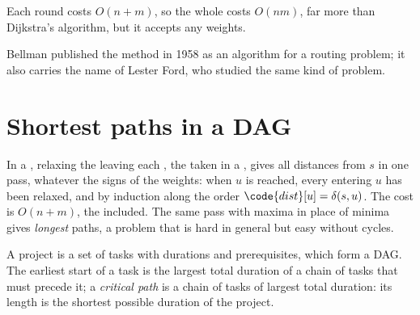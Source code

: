 Each round costs $O(n + m)$, so the whole costs $O(nm)$, far more than Dijkstra's algorithm, but it accepts any weights.

\label{out:b1:shortest-paths:bellman-ford}

Bellman published the method in 1958 as an algorithm for a routing problem; it also carries the name of Lester Ford,
who studied the same kind of problem.

\section{Shortest paths in a DAG}\label{sec:b1:shortest-paths:dag}

In a , relaxing the  leaving each , the  taken in a , gives
all distances from $s$ in one pass, whatever the signs of the weights: when $u$ is reached, every  entering $u$ has
been relaxed, and by induction along the order $\code{dist}[u] = \delta(s, u)$. The cost is $O(n + m)$, the
 included. The same pass with maxima in place of minima gives \emph{longest} paths, a problem that is
hard in general  but easy without cycles.

\begin{definition}\label{def:b1:shortest-paths:critical}
A project is a set of tasks with durations and prerequisites, which form a DAG. The earliest start of a task is the
largest total duration of a chain of tasks that must precede it; a \emph{critical path} is a chain
of tasks of largest total duration: its length is the shortest possible duration of the project.
\end{definition}

\label{lst:b1:shortest-paths:dag}

